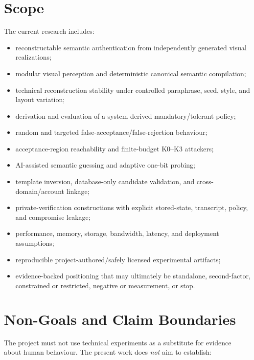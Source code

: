 \documentclass[11pt,a4paper]{article}
\begin{document}
\section{Scope}

The current research includes:
\begin{itemize}
  \item reconstructable semantic authentication from independently generated visual realizations;
  \item modular visual perception and deterministic canonical semantic compilation;
  \item technical reconstruction stability under controlled paraphrase, seed, style, and layout variation;
  \item derivation and evaluation of a system-derived mandatory/tolerant policy;
  \item random and targeted false-acceptance/false-rejection behaviour;
  \item acceptance-region reachability and finite-budget K0--K3 attackers;
  \item AI-assisted semantic guessing and adaptive one-bit probing;
  \item template inversion, database-only candidate validation, and cross-domain/account linkage;
  \item private-verification constructions with explicit stored-state, transcript, policy, and compromise leakage;
  \item performance, memory, storage, bandwidth, latency, and deployment assumptions;
  \item reproducible project-authored/safely licensed experimental artifacts;
  \item evidence-backed positioning that may ultimately be standalone, second-factor, constrained or restricted, negative or measurement, or stop.
\end{itemize}

\section{Non-Goals and Claim Boundaries}

The project must not use technical experiments as a substitute for evidence about human behaviour. The present work does \emph{not} aim to establish:
\end{document}
